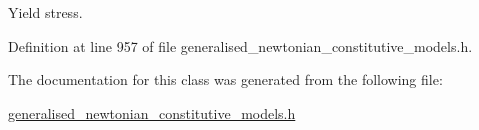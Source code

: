 Yield stress. 



Definition at line 957 of file generalised\+\_\+newtonian\+\_\+constitutive\+\_\+models.\+h.



The documentation for this class was generated from the following file\+:\begin{DoxyCompactItemize}
\item 
\hyperlink{generalised__newtonian__constitutive__models_8h}{generalised\+\_\+newtonian\+\_\+constitutive\+\_\+models.\+h}\end{DoxyCompactItemize}
